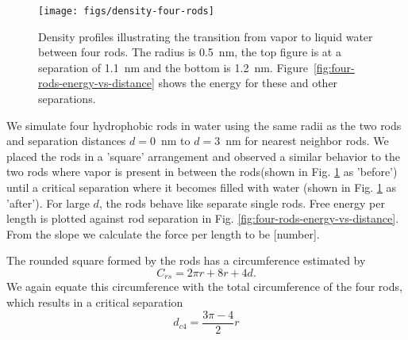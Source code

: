 \documentclass[letterpaper,twocolumn,amsmath,amssymb,prb]{revtex4-1}
\begin{document}
\begin{figure}
\begin{center}
\texttt{[image: figs/density-four-rods]}
\end{center}
\caption{ Density profiles illustrating the transition from vapor 
to liquid water between four rods. The radius is 0.5~nm, the top figure is 
at a separation of 1.1~nm and the
bottom is 1.2~nm. Figure~\ref{fig:four-rods-energy-vs-distance} shows
the energy for these and other separations.}

\label{fig:density-four-rods}
\end{figure}

We simulate four hydrophobic rods in water using the same radii as the two rods and
separation distances $d = 0$~nm to $d = 3$~nm for nearest neighbor rods. We placed
the rods in a 'square' arrangement and observed a similar behavior to the two rods
where vapor is present in between the rods(shown in Fig. \ref{fig:density-four-rods}
as 'before') until a critical separation where it becomes filled with water
(shown in Fig. \ref{fig:density-four-rods} as 'after'). For large $d$,
the rods behave like separate single rods.  Free energy per length
is plotted against rod separation in Fig. \ref{fig:four-rods-energy-vs-distance}.
From the slope we calculate the force per length to be [number].

The rounded square formed by the rods has a circumference estimated by
\begin{equation}
C_{rs} = 2 \pi r + 8r + 4d.
\end{equation}
We again equate this circumference with the total circumference of the four rods, which
results in a critical separation
\begin{equation}
d_{c4} = \frac{3 \pi - 4}{2} r \label{criticalfourrods}
\end{equation}
\end{document}
